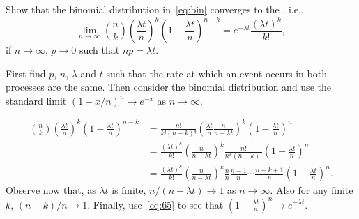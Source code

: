 \begin{exercise}{\faCalculator}\label{ex:31}
  Show that the binomial distribution in~\eqref{eq:bin} converges to the , i.e., 
 \begin{equation*}\label{eq:52}
   \lim_{n\to\infty} {n \choose k} \left(\frac{\lambda t}{n}\right)^k \left(1-\frac{\lambda t}n\right)^{n-k} = e^{-\lambda t} \frac{(\lambda t)^k}{k!},
 \end{equation*}
if $n\to\infty$, $p\to0$ such
  that $n p=\lambda t$. 
  \begin{hint}
First find $p$, $n$, $\lambda$ and $t$ such that the rate
    at which an event occurs in both processes are the same. Then consider
    the binomial distribution and use the standard limit
    $(1-x/n)^n \to e^{-x}$ as $n\to \infty$. 
  \end{hint}
  \begin{solution}
    \begin{align*}
      {n \choose k} \left(\frac{\lambda t}{n}\right)^k \left(1-\frac{\lambda t}n\right)^{n-k} 
&= \frac{n!}{k!(n-k)!} \left(\frac{\lambda t}{n}\frac{n}{n-\lambda t}\right)^k \left(1-\frac{\lambda t}n\right)^{n} \\
&= \frac{(\lambda t)^k}{k!} \left(\frac n{n-\lambda t} \right)^k  \frac{n!}{n^k(n-k)!}\left(1-\frac{\lambda t}n\right)^{n}\\
&= \frac{(\lambda t)^k}{k!} \left(\frac n{n-\lambda t} \right)^k \frac{n}{n}\frac{n-1}{n}\cdots\frac{n-k+1}{n} \left(1-\frac{\lambda t}n\right)^{n}.
\end{align*}
Observe now that, as $\lambda t$ is finite, $n/(n-\lambda t)\to 1$ as
$n\to \infty$. Also for any finite $k$, $(n-k)/n\to1$. Finally,  use~\eqref{eq:65} to see that
$\left(1-\frac{\lambda t}n\right)^{n} \to e^{-\lambda t}$.

  \end{solution}
\end{exercise}

